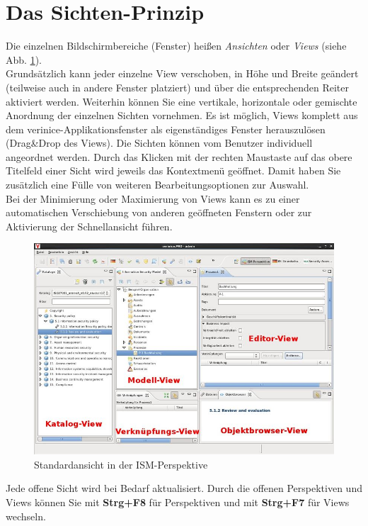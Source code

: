 \documentclass[a4paper,10pt]{book}
\begin{document}
\section{Das Sichten-Prinzip}
Die einzelnen Bildschirmbereiche (Fenster) heißen {\em Ansichten} oder {\em Views} (siehe Abb. \ref{Standardansicht in der ISM-Perspektive}).
\newline\\
Grundsätzlich kann jeder einzelne View verschoben, in Höhe und Breite geändert (teilweise auch in andere Fenster platziert) und über die
entsprechenden Reiter aktiviert werden. Weiterhin können Sie eine vertikale, horizontale oder gemischte Anordnung der einzelnen Sichten
vornehmen. Es ist möglich, Views komplett aus dem verinice-Applikationsfenster als eigenständiges Fenster herauszulösen (Drag\&Drop des Views).
Die Sichten können vom Benutzer individuell angeordnet werden. Durch das
Klicken mit der rechten Maustaste auf das obere Titelfeld einer Sicht wird jeweils das Kontextmenü geöffnet. Damit haben Sie zusätzlich
eine Fülle von weiteren Bearbeitungsoptionen zur Auswahl.
\newline\\
Bei der Minimierung oder Maximierung von Views kann es zu einer automatischen Verschiebung von anderen geöffneten Fenstern
oder zur Aktivierung der Schnellansicht führen.
\begin{figure}[htb!]
  \centering
  \includegraphics[scale=.43]{Screenshot/800px-Sichten-Prinzip.jpg}
  \caption{\label{Standardansicht in der ISM-Perspektive} Standardansicht in der ISM-Perspektive}
\end{figure}
Jede offene Sicht wird bei Bedarf aktualisiert. Durch die offenen Perspektiven und Views können Sie mit \textbf{Strg+F8} für Perspektiven und mit \textbf{Strg+F7} für Views wechseln.
\end{document}
